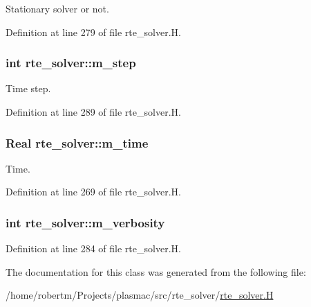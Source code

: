 Stationary solver or not. 



Definition at line 279 of file rte\+\_\+solver.\+H.

\subsubsection[{\texorpdfstring{m\+\_\+step}{m_step}}]{\setlength{\rightskip}{0pt plus 5cm}int rte\+\_\+solver\+::m\+\_\+step\hspace{0.3cm}{\ttfamily [protected]}}\hypertarget{classrte__solver_aa6d238b5717c812569053af3665bfd07}{}\label{classrte__solver_aa6d238b5717c812569053af3665bfd07}


Time step. 



Definition at line 289 of file rte\+\_\+solver.\+H.

\subsubsection[{\texorpdfstring{m\+\_\+time}{m_time}}]{\setlength{\rightskip}{0pt plus 5cm}Real rte\+\_\+solver\+::m\+\_\+time\hspace{0.3cm}{\ttfamily [protected]}}\hypertarget{classrte__solver_af312dbcc4214dbe8ab2cb341326e8730}{}\label{classrte__solver_af312dbcc4214dbe8ab2cb341326e8730}


Time. 



Definition at line 269 of file rte\+\_\+solver.\+H.

\subsubsection[{\texorpdfstring{m\+\_\+verbosity}{m_verbosity}}]{\setlength{\rightskip}{0pt plus 5cm}int rte\+\_\+solver\+::m\+\_\+verbosity\hspace{0.3cm}{\ttfamily [protected]}}\hypertarget{classrte__solver_a0e3aca30e263c405bcc3753dda26aebf}{}\label{classrte__solver_a0e3aca30e263c405bcc3753dda26aebf}


Definition at line 284 of file rte\+\_\+solver.\+H.



The documentation for this class was generated from the following file\+:\begin{DoxyCompactItemize}
\item 
/home/robertm/\+Projects/plasmac/src/rte\+\_\+solver/\hyperlink{rte__solver_8H}{rte\+\_\+solver.\+H}\end{DoxyCompactItemize}
